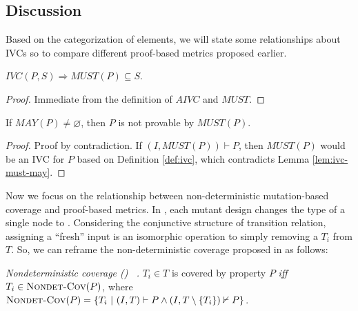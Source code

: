 \subsection{Discussion}
\label{subsec:method-disc}


Based on the categorization of elements, we will state some relationships about IVCs so to compare different proof-based metrics proposed earlier.

\begin{lemma}
  \label{lem:ivc-must-may}
 $IVC(P, S) \Rightarrow  MUST(P) \subseteq S$.
\end{lemma}
\begin{proof}
 Immediate from the definition of $AIVC$ and $MUST$.
\end{proof}
\vspace{2mm}

\begin{lemma}
  \label{lem:must-not-enough}
  If $MAY(P) \neq \varnothing$, then $P$ is not provable by $MUST(P)$.
\end{lemma}
\begin{proof}
  Proof by contradiction. If $(I, MUST(P)) \vdash P$, then $MUST(P)$
  would be an IVC for $P$ based on Definition \ref{def:ivc},
  which contradicts Lemma \ref{lem:ivc-must-may}.
\end{proof}
\vspace{2mm}


Now we focus on the relationship between non-deterministic mutation-based coverage and proof-based metrics. In \cite{chockler2010coverage}, each mutant design changes the type of a single node to . Considering the conjunctive structure of transition relation, assigning a ``fresh'' input is an isomorphic operation to simply removing a $T_i$ from $T$.
So, we can reframe the non-deterministic coverage proposed in \cite{chockler2010coverage} as follows:
\begin{definition} {\emph{Nondeterministic coverage (\nondetcov) ~\cite{chockler2010coverage}.} }
\label{def:non-det-2}
$T_i \in T$ is covered by property $P$ \emph{iff} $T_i \in \text{\sc Nondet-Cov} (P)$, where
$\text{\sc Nondet-Cov} (P) = \{T_i~|~ (I, T) \vdash P \wedge (I, T \setminus \{T_i\}) \nvdash P\}$.
\end{definition}


